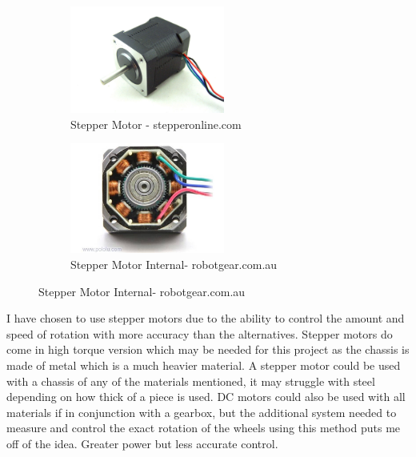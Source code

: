 \begin{itemize}
\begin{figure}[h]
\centering
\begin{subfigure}
	\centering
        \includegraphics[width=2.0in] {Images/stepper.jpg}
        \caption{Stepper Motor - stepperonline.com}
        \label{Stepper Motor}
\end{subfigure}
\begin{subfigure}
        \centering
        \includegraphics[width=2.0in] {Images/stepper-internal.jpg}
        \caption{Stepper Motor Internal- robotgear.com.au}
        \label{Stepper Motor Internal}
\end{subfigure}
\end{figure}
\end{itemize}

I have chosen to use stepper motors due to the ability to control the amount and speed of rotation with more accuracy than the alternatives.  Stepper motors do come in high torque version which may be needed for this project as the chassis is made of metal which is a much heavier material.  A stepper motor could be used with a chassis of any of the materials mentioned, it may struggle with steel depending on how thick of a piece is used.  DC motors could also be used with all materials if in conjunction with a gearbox, but the additional system needed to measure and control the exact rotation of the wheels using this method puts me off of the idea.  Greater power but less accurate control.
